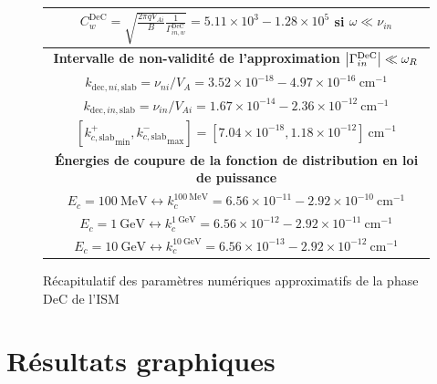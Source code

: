 \documentclass[10pt,a4paper]{article}
\begin{document}
\begin{figure}[h]
\begin{tabular}{|c|}
$C^\mathrm{DeC}_w = \sqrt{\frac{2\pi qV_{Ai}}{B} \frac{1}{\Gamma^\mathrm{DeC}_{in,w}}} = 5.11\times 10^3 - 1.28 \times 10^5$ si $\omega \ll \nu_{in}$ \\ 
\hline 
\hline
\bf{Intervalle de non-validité de l'approximation $\abs{\Gamma^\mathrm{DeC}_{in}} \ll \omega_R$} \\ 
\hline
$k_{\mathrm{dec},ni,\mathrm{slab}} = \nu_{ni}/V_A = 3.52\times 10^{-18} - 4.97 \times 10^{-16} ~ \mathrm{cm}^{-1}$ \\ 
$k_{\mathrm{dec},in,\mathrm{slab}} = \nu_{in}/V_{Ai} = 1.67\times 10^{-14} - 2.36 \times 10^{-12} ~ \mathrm{cm}^{-1}$ \\ 
$\left[{k^+_{c,\mathrm{slab}}}_\mathrm{min}, {k^-_{c,\mathrm{slab}}}_\mathrm{max} \right] = [7.04 \times 10^{-18}, 1.18\times 10^{-12}] ~ \mathrm{cm}^{-1}$ \\ 
\hline
\hline
\bf{Énergies de coupure de la fonction de distribution en loi de puissance} \\ 
\hline
$E_c = 100~\mathrm{MeV} \leftrightarrow k^{100~\mathrm{MeV}}_c = 6.56\times 10^{-11} - 2.92 \times 10^{-10}~\mathrm{cm}^{-1}$ \\ 
$E_c = 1~\mathrm{GeV} \leftrightarrow k^{1~\mathrm{GeV}}_c = 6.56\times 10^{-12} - 2.92 \times 10^{-11} ~\mathrm{cm}^{-1}$     \\ 
$E_c = 10~\mathrm{GeV} \leftrightarrow k^{10~\mathrm{GeV}}_c = 6.56\times 10^{-13} - 2.92 \times 10^{-12}~\mathrm{cm}^{-1}$   \\ 
\hline

\end{tabular}
\caption{Récapitulatif des paramètres numériques approximatifs de la phase DeC de l'ISM} 
\label{param_DeC}
\end{figure}

\section{Résultats graphiques}
\end{document}

